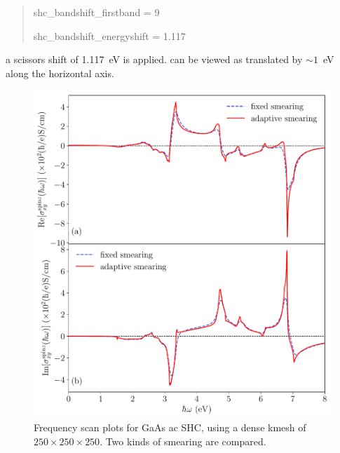 \begin{itemize}
{\begin{quote}
		shc\_bandshift\_firstband = 9

		shc\_bandshift\_energyshift = 1.117
\end{quote} }
a scissors shift of 1.117~eV is applied.
 can be viewed as  translated by
$\sim1$~eV along the horizontal axis.
\begin{figure}[!htb]
\centering
\includegraphics[width=0.8\columnwidth]{figure/example30/gaas_freqscan.pdf}
\caption{Frequency scan plots for GaAs ac SHC, using
	a dense kmesh of $250\times250\times250$.
Two kinds of smearing are compared.}
\label{fig30.2}
\end{figure}
\end{itemize}

